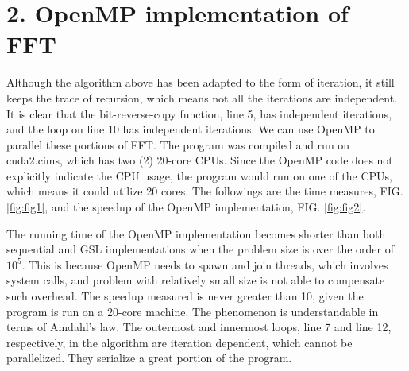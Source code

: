 \documentclass[amsmath,amssymb]{revtex4}
\begin{document}
\section{\label{sec:sec2}2. OpenMP implementation of FFT}
Although the algorithm above has been adapted to the form of iteration, it still keeps the trace of recursion, which means not all the iterations are independent. It is clear that the bit-reverse-copy function, line 5, has independent iterations, and the loop on line 10 has independent iterations. We can use OpenMP to parallel these portions of FFT. The program was compiled and run on cuda2.cims, which has two (2) 20-core CPUs. Since the OpenMP code does not explicitly indicate the CPU usage, the program would run on one of the CPUs, which means it could utilize 20 cores. The followings are the time measures, FIG. \ref{fig:fig1}, and the speedup of the OpenMP implementation, FIG. \ref{fig:fig2}.

The running time of the OpenMP implementation becomes shorter than both sequential and GSL implementations when the problem size is over the order of $10^5$. This is because OpenMP needs to spawn and join threads, which involves system calls, and problem with relatively small size is not able to compensate such overhead. The speedup measured is never greater than 10, given the program is run on a 20-core machine. The phenomenon is understandable in terms of Amdahl's law. The outermost and innermost loops, line 7 and line 12, respectively, in the algorithm are iteration dependent, which cannot be parallelized. They serialize a great portion of the program.
\end{document}
